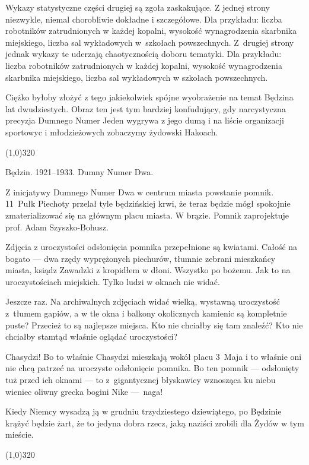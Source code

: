 \documentclass[11pt,a4paper,oneside]{article}
\begin{document}
Wykazy statystyczne części drugiej są zgoła zaskakujące. Z jednej
strony niezwykle, niemal chorobliwie dokładne i szczegółowe. Dla
przykładu: liczba robotników zatrudnionych w każdej kopalni, wysokość
wynagrodzenia skarbnika miejskiego, liczba sal wykładowych w~szkołach
powszechnych. Z~drugiej strony jednak wykazy te uderzają chaotycznością
doboru tematyki. Dla przykładu: liczba robotników zatrudnionych w każdej kopalni,
wysokość wynagrodzenia skarbnika miejskiego, liczba sal wykładowych w
szkołach powszechnych. 

Ciężko byłoby złożyć z tego jakiekolwiek spójne wyobrażenie na temat
Będzina lat dwudziestych. Obraz ten jest tym bardziej konfudujący, gdy
narcystyczna precyzja Dumnego Numer Jeden wygrywa z jego dumą i na
liście organizacji sportowyc i młodzieżowych zobaczymy żydowski Hakoach.



\line(1,0){320}

Będzin. 1921--1933. Dumny Numer Dwa.

Z inicjatywy Dumnego Numer Dwa w centrum miasta powstanie pomnik.
11~Pułk Piechoty przelał tyle będzińskiej krwi, że teraz będzie mógł
spokojnie zmaterializować się na głównym placu miasta. W brązie.
Pomnik zaprojektuje prof. Adam Szyszko-Bohusz.

Zdjęcia z uroczystości odsłonięcia pomnika przepełnione są kwiatami.
Całość na bogato --- dwa rzędy wyprężonych piechurów, tłumnie zebrani
mieszkańcy miasta, ksiądz Zawadzki z kropidłem w dłoni.  Wszystko po
bożemu.  Jak to na uroczystościach miejskich.  Tylko ludzi w oknach
nie widać.

Jeszcze raz. Na archiwalnych zdjęciach widać wielką, wystawną
uroczystość z~tłumem gapiów, a w tle okna i balkony okolicznych
kamienic są kompletnie puste?  Przecież to są najlepsze miejsca. Kto
nie chciałby się tam znaleźć?  Kto nie chciałby stamtąd właśnie
oglądać uroczystości?

Chasydzi! Bo to właśnie Chasydzi mieszkają wokół placu 3~Maja i to
właśnie oni nie chcą patrzeć na uroczyste odsłonięcie pomnika. Bo ten
pomnik --- odsłonięty tuż przed ich oknami --- to z~gigantycznej błyskawicy
wznosząca ku niebu wieniec oliwny grecka bogini Nike ---~naga!

Kiedy Niemcy wysadzą ją w grudniu trzydziestego dziewiątego, po
Będzinie krążyć będzie żart, że to jedyna dobra rzecz, jaką naziści
zrobili dla Żydów w tym mieście.

\line(1,0){320}
\end{document}
